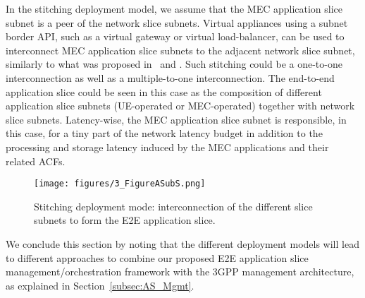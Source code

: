 In the stitching deployment model, we assume that the MEC application slice subnet is a peer of the network slice subnets. Virtual appliances using a subnet border API, such as a virtual gateway or virtual load-balancer, can be used to interconnect MEC application slice subnets to the adjacent network slice subnet, similarly to what was proposed in~\cite{2020_MNET_MEC_subslice} and \cite{2021_TNSM_e22_slice_survey}. Such stitching could be a one-to-one interconnection as well as a multiple-to-one interconnection. The end-to-end application slice could be seen in this case as the composition of different application slice subnets (UE-operated or MEC-operated) together with network slice subnets. Latency-wise, the MEC application slice subnet is responsible, in this case, for a tiny part of the network latency budget in addition to the processing and storage latency induced by the MEC applications and their related ACFs.
%
\begin{figure}[ht]
\centering
\texttt{[image: figures/3\_FigureASubS.png]}
\caption{Stitching deployment mode: interconnection of the different slice subnets to form the E2E application slice.}
\label{3_figASstitch}
\end{figure}
%

We conclude this section by noting that the different deployment models will lead to different approaches to combine our proposed E2E application slice management/orchestration framework with the 3GPP management architecture, as explained in Section~\ref{subsec:AS_Mgmt}.

%

